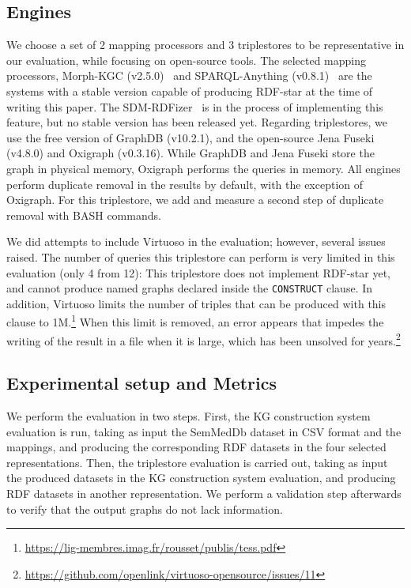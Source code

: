 \subsection{Engines}
\label{sec:chp6-1_engines}
We choose a set of 2 mapping processors and 3 triplestores to be representative in our evaluation, while focusing on open-source tools. The selected mapping processors, Morph-KGC (v2.5.0)~\cite{arenas2022morphkgc} and SPARQL-Anything (v0.8.1)~\cite{asprino2023sparql-anything} are the systems with a stable version capable of producing RDF-star at the time of writing this paper. The SDM-RDFizer~\cite{iglesias2020rdfizer} is in the process of implementing this feature, but no stable version has been released yet. Regarding triplestores, we use the free version of GraphDB (v10.2.1), and the open-source Jena Fuseki (v4.8.0) and Oxigraph (v0.3.16). While GraphDB and Jena Fuseki store the graph in physical memory, Oxigraph performs the queries in memory. All engines perform duplicate removal in the results by default, with the exception of Oxigraph. For this triplestore, we add and measure a second step of duplicate removal with BASH commands.


We did attempts to include Virtuoso in the evaluation; however, several issues raised. The number of queries this triplestore can perform is very limited in this evaluation (only 4 from 12): This triplestore
does not implement RDF-star yet, and cannot produce named graphs declared inside the \texttt{CONSTRUCT} clause. In addition, Virtuoso limits the number of triples that can be produced with this clause to 1M.\footnote{\url{https://lig-membres.imag.fr/rousset/publis/tess.pdf}} When this limit is removed, an error appears that impedes the writing of the result in a file when it is large, which has been unsolved for years.\footnote{\url{https://github.com/openlink/virtuoso-opensource/issues/11}} 




\subsection{Experimental setup and Metrics}
\label{sec:chp6-1_exp-setup}
We perform the evaluation in two steps. First, the KG construction system evaluation is run, taking as input the SemMedDb dataset in CSV format and the mappings, and producing the corresponding RDF datasets in the four selected representations. Then, the triplestore evaluation is carried out, taking as input the produced datasets in the KG construction system evaluation, and producing RDF datasets in another representation. We perform a validation step afterwards to verify that the output graphs do not lack information.


